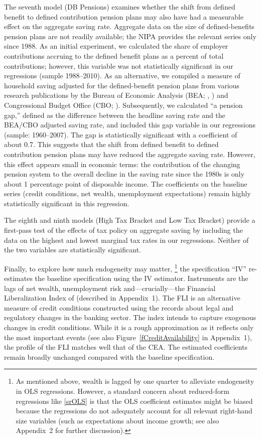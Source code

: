 \documentclass[titlepage]{\econtex}
\begin{document}
The seventh model (DB Pensions) examines whether the shift from defined benefit to defined contribution pension plans
 may also have had a measurable effect on the aggregate saving rate. Aggregate data on the size of defined-benefits pension
 plans are not readily available; the NIPA provides the relevant series only since 1988. As an initial experiment,
 we calculated the share of employer contributions accruing to the defined benefit plans as a percent of total contributions;
 however, this variable was not statistically significant in our regressions (sample 1988--2010). As an alternative, we compiled
 a measure of household saving adjusted for the defined-benefit pension plans from various research publications
 by the Bureau of Economic Analysis (BEA; \cite{kmitchSaving}, \cite{prSaving}) and Congressional Budget Office (CBO; \cite{CBOSaving}). Subsequently, we calculated ``a pension gap,'' defined as the difference between the headline saving rate
 and the BEA/CBO adjusted saving rate, and included this gap variable in our regressions (sample: 1960--2007). The gap is statistically
 significant with a coefficient of about 0.7. This suggests that the shift from defined benefit to defined contribution pension plans
 may have reduced the aggregate saving rate. However, this effect appears small in economic terms: the contribution of the changing pension system
 to the overall decline in the saving rate since the 1980s is only about 1 percentage point of disposable income. The coefficients on the baseline series (credit conditions, net wealth, unemployment expectations) remain highly statistically significant in this regression.

The eighth and ninth models (High Tax Bracket and Low Tax Bracket) provide a first-pass test of the effects of tax policy
 on aggregate saving by including the data on the highest and lowest marginal tax rates in our regressions. Neither of the two
 variables are statistically significant.


Finally, to explore how much endogeneity may matter,%
\footnote{As mentioned above, wealth is lagged by one quarter to alleviate
  endogeneity in OLS regressions.  However, a standard concern about reduced-form regressions like \eqref{srOLS} is that the OLS coefficient estimates might be biased because the regressions do not adequately account for all relevant right-hand size variables (such as expectations about income growth; see also Appendix~2 for further discussion).
  }
  the specification ``IV'' re-estimates
the baseline specification using the IV estimator. Instruments are
the lags of net wealth, unemployment risk and---crucially---the Financial Liberalization Index of \cite{abiadEtAl_FinReforms} (described in Appendix~1).
The FLI is an alternative measure of credit conditions constructed using the records about legal and regulatory changes in the banking sector. The index intends to capture exogenous changes in credit conditions. While it is a rough approximation as it reflects only the most important events (see also Figure~\ref{fCreditAvailability} in Appendix~1), the profile of the FLI matches well that of the CEA. The
estimated coefficients remain broadly unchanged compared with the baseline specification.
\end{document}
